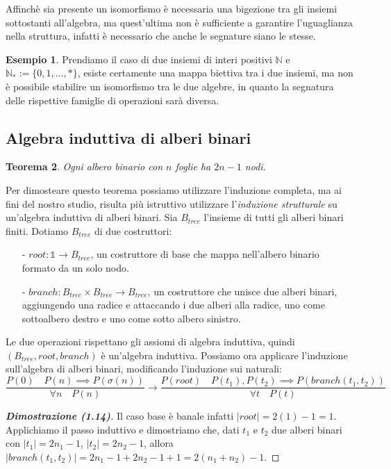 \documentclass{article}
\newtheorem{theorem}{Teorema}[section]
\theoremstyle{definition}
\theoremstyle{definition}
\theoremstyle{definition}
\newtheorem{example}[theorem]{Esempio}
\theoremstyle{remark}
\begin{document}
Affinchè sia presente un isomorfismo è necessaria una bigezione tra gli insiemi sottostanti all'algebra, ma quest'ultima non è sufficiente a garantire l'uguaglianza nella struttura, infatti
è necessario che anche le segnature siano le stesse.
\begin{example} Prendiamo il caso di due insiemi di interi positivi $\mathbb{N}$ e $\mathbb{N}_*:=\{0,1,\dots,*\}$, esiste certamente una mappa biettiva tra i due insiemi, ma non è possibile stabilire un isomorfismo tra le due algebre, in quanto la segnatura delle rispettive
    famiglie di operazioni sarà diversa.
\end{example}
\subsection{Algebra induttiva di alberi binari}
\begin{theorem}
    Ogni albero binario con $n$ foglie ha $2n-1$ nodi.
\end{theorem}

Per dimosteare questo teorema possiamo utilizzare l'induzione completa, ma ai fini del nostro studio, risulta più istruttivo utilizzare l'\textit{induzione strutturale} su un'algebra induttiva di alberi binari.
Sia $B_{tree}$ l'insieme di tutti gli alberi binari finiti. Dotiamo $B_{tree}$ di due costruttori:
\begin{itemize}
    \item [-] $root : \mathds{1}\to B_{tree}$, un costruttore di base che mappa nell'albero binario formato da un solo nodo.
    \item [-] $branch: B_{tree}\times B_{tree} \to B_{tree}$, un costruttore che unisce due alberi binari, aggiungendo una radice e attaccando i due alberi alla radice, uno come sottoalbero destro e uno come sotto albero sinistro.
\end{itemize}
Le due operazioni rispettano gli assiomi di algebra
induttiva, quindi \\$(B_{tree},root,branch)$ è un'algebra induttiva.
    Possiamo ora applicare l'induzione sull'algebra di alberi binari, modificando l'induzione sui naturali:
    $$ \frac{P(0)\quad P(n)\implies P(\sigma(n))}{\forall n\quad P(n)}\to \frac{P(root)\quad P(t_1),P(t_2)\implies P(branch(t_1,t_2))}{\forall t \quad P(t)}$$

    \begin{proof}[\textbf{Dimostrazione (1.14)}]Il caso base è banale infatti $|root| = 2(1)-1 = 1$. Applichiamo il passo induttivo e dimostriamo che, dati
        $t_1$ e $t_2$ due alberi binari con $|t_1| =2n_1-1$, $|t_2| = 2n_2-1$,  allora $|branch(t_1,t_2)| = 2n_1-1 + 2n_2 -1 +1 = 2(n_1+n_2)-1$.
    \end{proof}
\end{document}
